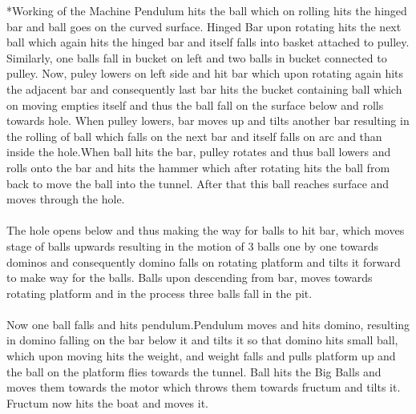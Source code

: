 \documentclass[11pt]{article}
\begin{document}
\begin{subsection}*{Working of the Machine}
 Pendulum hits the ball which on rolling hits the hinged bar and ball goes on the curved surface. Hinged Bar upon rotating hits the next ball which again hits the hinged bar and itself falls into basket attached to pulley. Similarly, one balls fall in bucket on left and two balls in bucket connected to pulley. Now, puley lowers on left side and hit bar which upon rotating again hits the adjacent bar and consequently last bar hits the bucket containing ball which on moving empties itself and thus the ball fall on the surface below and rolls towards hole. When pulley lowers, bar moves up and tilts another bar resulting in the rolling of ball which falls on the next bar and itself falls on arc and than inside the hole.When ball hits the bar, pulley rotates and thus ball lowers and rolls onto the bar and hits the hammer which after rotating hits the ball from back to move the ball into the tunnel. After that this ball reaches surface and moves through the hole.
\\\\
The hole opens below and thus making the way for balls to hit bar, which moves stage of balls upwards resulting in the motion of 3 balls one by one towards dominos and consequently domino falls on rotating platform and tilts it forward to make way for the balls. Balls upon descending from bar, moves towards rotating platform and in the process three balls fall in the pit.
\\\\
Now one ball falls and hits pendulum.Pendulum moves and hits domino, resulting in domino falling on the bar below it and tilts it so that domino hits small ball, which upon moving hits the weight, and weight falls and pulls platform up and the ball on the platform flies towards the tunnel. Ball hits the Big Balls and moves them towards the motor which throws them towards fructum and tilts it. Fructum now hits the boat and moves it.
\end{subsection}
\end{document}
